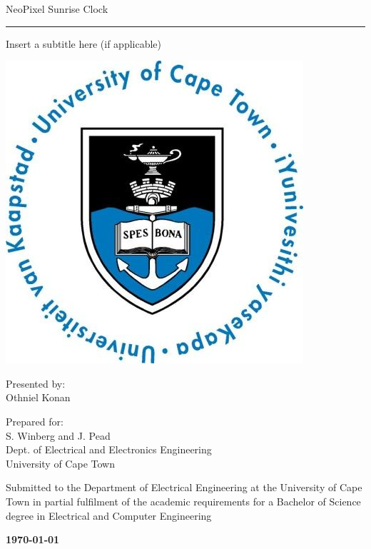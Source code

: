 \thispagestyle{empty}
{\Huge \begin{center}
NeoPixel Sunrise Clock
\hrule 
{\Large Insert a subtitle here (if applicable)}
\end{center}}

\vskip 5mm
\begin{center}
\- \- \- \- \- \- \- \- \- \-\includegraphics[scale = 0.3]{uctLogo.png}
\end{center}

\vskip 5mm
\begin{center}
Presented by:\\
Othniel Konan		%
\end{center}

\vskip 10mm
\begin{center}
Prepared for:\\
S. Winberg and J. Pead\\ 		%
Dept. of Electrical and Electronics Engineering\\University of Cape Town
\end{center}


\vskip 10mm
\begin{center}
Submitted to the Department of Electrical Engineering at the University of Cape Town in partial
fulfilment of the academic requirements for a Bachelor of Science degree in Electrical and Computer Engineering

\end{center}


\vskip 5mm
\begin{center}{\bf \today}
\end{center}